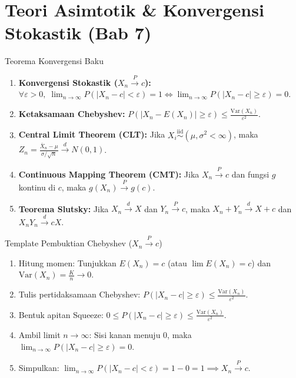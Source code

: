 \documentclass[10pt,twoside]{article}
\begin{document}
\section{Teori Asimtotik \& Konvergensi Stokastik (Bab 7)}

\begin{teoribox}{Teorema Konvergensi Baku}
\begin{enumerate}
  \item \textbf{Konvergensi Stokastik ($X_n \xrightarrow{P} c$):}
    $\forall \varepsilon > 0, \; \lim_{n \to \infty} P(|X_n - c| < \varepsilon) = 1 \iff \lim_{n \to \infty} P(|X_n - c| \ge \varepsilon) = 0$.
  \item \textbf{Ketaksamaan Chebyshev:}
    $P(|X_n - E(X_n)| \ge \varepsilon) \le \frac{\mathrm{Var}(X_n)}{\varepsilon^2}$.
  \item \textbf{Central Limit Theorem (CLT):}
    Jika $X_i \stackrel{\text{iid}}{\sim} (\mu, \sigma^2 < \infty)$, maka $Z_n = \frac{\bar{X}_n - \mu}{\sigma/\sqrt{n}} \xrightarrow{d} N(0, 1)$.
  \item \textbf{Continuous Mapping Theorem (CMT):}
    Jika $X_n \xrightarrow{P} c$ dan fungsi $g$ kontinu di $c$, maka $g(X_n) \xrightarrow{P} g(c)$.
  \item \textbf{Teorema Slutsky:}
    Jika $X_n \xrightarrow{d} X$ dan $Y_n \xrightarrow{P} c$, maka $X_n + Y_n \xrightarrow{d} X + c$ dan $X_n Y_n \xrightarrow{d} cX$.
\end{enumerate}
\end{teoribox}

\begin{stepbox}{Template Pembuktian Chebyshev ($X_n \xrightarrow{P} c$)}
\begin{enumerate}
  \item Hitung momen: Tunjukkan $E(X_n) = c$ (atau $\lim E(X_n) = c$) dan $\mathrm{Var}(X_n) = \frac{K}{n} \to 0$.
  \item Tulis pertidaksamaan Chebyshev: $P(|X_n - c| \ge \varepsilon) \le \frac{\mathrm{Var}(X_n)}{\varepsilon^2}$.
  \item Bentuk apitan Squeeze: $0 \le P(|X_n - c| \ge \varepsilon) \le \frac{\mathrm{Var}(X_n)}{\varepsilon^2}$.
  \item Ambil limit $n \to \infty$: Sisi kanan menuju 0, maka $\lim_{n \to \infty} P(|X_n - c| \ge \varepsilon) = 0$.
  \item Simpulkan: $\lim_{n \to \infty} P(|X_n - c| < \varepsilon) = 1 - 0 = 1 \implies X_n \xrightarrow{P} c$.
\end{enumerate}
\end{stepbox}
\end{document}
